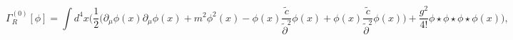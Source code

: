 \begin{equation}
\Gamma^{(0)}_R[\phi] = \int d^4x\Big(\frac12\big(\partial_\mu\phi(x) 
\partial_\mu\phi(x) +
m^2\phi^2(x) -\phi(x)\frac{\tilde c}{\tilde\partial^2}\phi(x) + 
\phi(x)\frac{\tilde c}{\tilde\partial^2}\phi(x)\big)
+ \frac{g^2}{4!}\phi\star\phi\star\phi\star\phi(x)\Big), \label{resact}
\end{equation}

